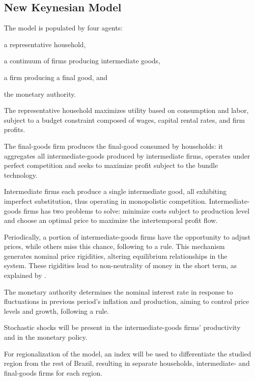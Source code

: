 \documentclass[
thesis.tex
]{subfiles}
\begin{document}
	
	\newpage
	
	\subsection{New Keynesian Model}\label{sec:nk-model}

	The model is populated by four agents: 
	\begin{enumerate*}[label=(\arabic*)]
		\item a representative household,
		\item a continuum of firms producing intermediate goods,
		\item a firm producing a final good, and
		\item the monetary authority.
	\end{enumerate*}
	
	The representative household maximizes utility based on consumption and labor, subject to a budget constraint composed of wages, capital rental rates, and firm profits.
	
	The final-goods firm produces the final-good consumed by households: it aggregates all intermediate-goods produced by intermediate firms, operates under perfect competition and seeks to maximize profit subject to the bundle technology.
	
	Intermediate firms each produce a single intermediate good, all exhibiting imperfect substitution, thus operating in monopolistic competition. Intermediate-goods firms has two problems to solve: minimize costs subject to production level and choose an optimal price to maximize the intertemporal profit flow.
	
	Periodically, a portion of intermediate-goods firms have the opportunity to adjust prices, while others miss this chance, following to a \textcite{calvo_staggered_1983} rule. This mechanism generates nominal price rigidities, altering equilibrium relationships in the system. These rigidities lead to non-neutrality of money in the short term, as explained by \textcite[p.191]{costa_junior_understanding_2016}.
	
	The monetary authority determines the nominal interest rate in response to fluctuations in previous period's inflation and production, aiming to control price levels and growth, following a \textcite{taylor_discretion_1993} rule.
	
	Stochastic shocks will be present in the intermediate-goods firms' productivity and in the monetary policy.
	
	For regionalization of the model, an index will be used to differentiate the studied region from the rest of Brazil, resulting in separate households, intermediate- and final-goods firms for each region.
	
\end{document}
